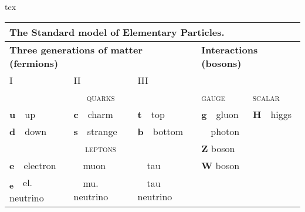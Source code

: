 \documentclass[
	raggedright,
	twoside,
	12pt,
	colorful,
]{tufte-style-article}
\begin{document}
\begin{codebox}{tex}
\begin{table}[!htb]\small
	\begin{tabular}{lllll}
		\multicolumn{5}{l}{\textbf{The Standard model of Elementary Particles.}}\\
		\toprule
		\multicolumn{3}{l}{\textbf{Three generations of matter (fermions)}} & \multicolumn{2}{l}{\textbf{Interactions (bosons)}} \\
		I & II & III & & \\
		\multicolumn{3}{c}{\textsc{quarks}} & \textsc{gauge} & \textsc{scalar} \\
		\cmidrule(lr){1-3}\cmidrule(lr){4-4}\cmidrule(lr){5-5}
		\textbf{u}~~up & \textbf{c}~~charm & \textbf{t}~~top & \textbf{g}~~gluon & \textbf{H}~~higgs \\
		\textbf{d}~~down & \textbf{s}~~strange & \textbf{b}~~bottom & \textbf{\textgamma}~~photon & \\
		\multicolumn{3}{c}{\textsc{leptons}} & \textbf{Z} boson  & \\
		\cmidrule(lr){1-3}
		\textbf{e}~~electron & \textbf{\textmu}~~muon & \textbf{\texttau}~~tau & \textbf{W} boson & \\
		\textbf{\textnu\textsubscript{e}}~~el. neutrino & \textbf{\textnu\textsubscript{\textmu}}~~mu. neutrino & \textbf{\textnu\textsubscript{\texttau}}~~tau neutrino &  & \\
		\bottomrule
	\end{tabular}
\end{table}
\end{codebox}
\end{document}
